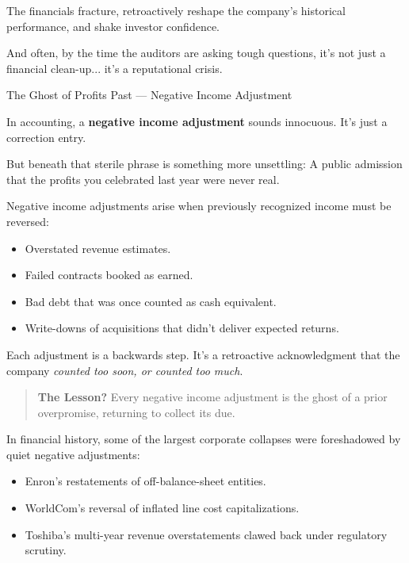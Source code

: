 The financials fracture, retroactively reshape the company’s historical performance, and shake investor confidence.

And often, by the time the auditors are asking tough questions, it’s not just a financial clean-up... 
it’s a reputational crisis.

\medskip

\begin{HistoricalSidebar}{The Ghost of Profits Past --- Negative Income Adjustment}
  
  In accounting, a \textbf{negative income adjustment} sounds innocuous. It's just a correction entry.
  
  \medskip
  
  But beneath that sterile phrase is something more unsettling:  
  A public admission that the profits you celebrated last year were never real.
  
  \medskip
  
  Negative income adjustments arise when previously recognized income must be reversed:

  \medskip

  \begin{itemize}
      \item Overstated revenue estimates.
      \item Failed contracts booked as earned.
      \item Bad debt that was once counted as cash equivalent.
      \item Write-downs of acquisitions that didn’t deliver expected returns.
  \end{itemize}

  \medskip
  
  Each adjustment is a backwards step. It's a retroactive acknowledgment that the company \textit{counted too soon, or counted too much}.
  
  \begin{quote}
  \textbf{The Lesson?} Every negative income adjustment is the ghost of a prior overpromise, returning to collect its due.
  \end{quote}
  
  In financial history, some of the largest corporate collapses were foreshadowed by quiet negative adjustments:
  
  \medskip
  
  \begin{itemize}
      \item Enron’s restatements of off-balance-sheet entities.
      \item WorldCom’s reversal of inflated line cost capitalizations.
      \item Toshiba’s multi-year revenue overstatements clawed back under regulatory scrutiny.
  \end{itemize}
  

\end{HistoricalSidebar}
